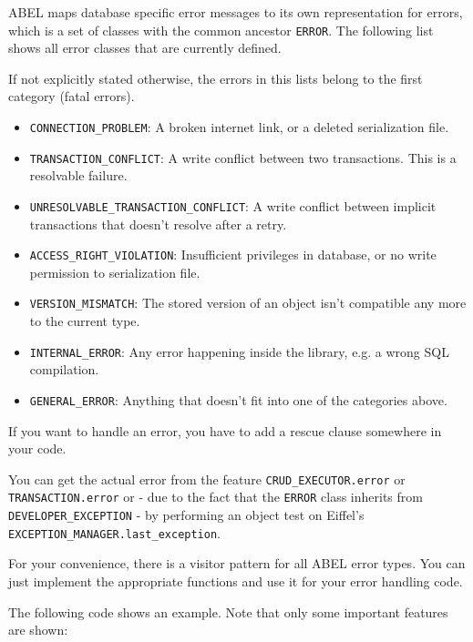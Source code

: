 ABEL maps database specific error messages to its own representation for errors, which is a set of classes with the common ancestor \lstinline!ERROR!.
The following list shows all error classes that are currently defined.

If not explicitly stated otherwise, the errors in this lists belong to the first category (fatal errors).

\begin{itemize}
\item \lstinline!CONNECTION_PROBLEM!: A broken internet link, or a deleted serialization file.
\item \lstinline!TRANSACTION_CONFLICT!: A write conflict between two transactions. This is a resolvable failure.
\item \lstinline!UNRESOLVABLE_TRANSACTION_CONFLICT!: A write conflict between implicit transactions that doesn't resolve after a retry.
\item \lstinline!ACCESS_RIGHT_VIOLATION!: Insufficient privileges in database, or no write permission to serialization file.
\item \lstinline!VERSION_MISMATCH!: The stored version of an object isn't compatible any more to the current type.
\item \lstinline!INTERNAL_ERROR!: Any error happening inside the library, e.g. a wrong SQL compilation.
\item \lstinline!GENERAL_ERROR!: Anything that doesn't fit into one of the categories above.
\end{itemize}

If you want to handle an error, you have to add a rescue clause somewhere in your code.

You can get the actual error from the feature \lstinline!CRUD_EXECUTOR.error! or \lstinline!TRANSACTION.error! or - due to the fact that the \lstinline!ERROR! class inherits from \lstinline!DEVELOPER_EXCEPTION! -
by performing an object test on Eiffel's \lstinline!EXCEPTION_MANAGER.last_exception!.

For your convenience, there is a visitor pattern for all ABEL error types. 
You can just implement the appropriate functions and use it for your error handling code.

The following code shows an example. 
Note that only some important features are shown:

